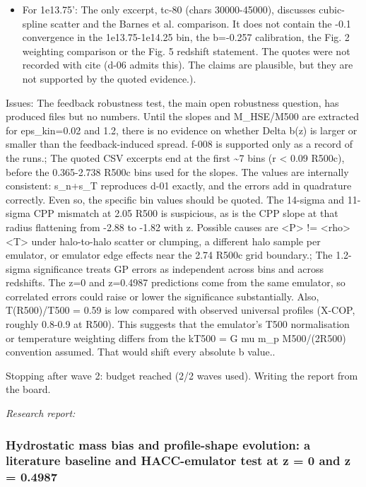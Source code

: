 \documentclass[11pt,a4paper]{article}
\begin{document}
\begin{itemize}
  \item For 1e13.75': The only excerpt, tc-80 (chars 30000-45000), discusses cubic-spline scatter and the Barnes et al. comparison. It does not contain the -0.1 convergence in the 1e13.75-1e14.25 bin, the b=-0.257 calibration, the Fig. 2 weighting comparison or the Fig. 5 redshift statement. The quotes were not recorded with cite (d-06 admits this). The claims are plausible, but they are not supported by the quoted evidence.).
\end{itemize}
Issues: The feedback robustness test, the main open robustness question, has produced files but no numbers. Until the slopes and M\_HSE/M500 are extracted for eps\_kin=0.02 and 1.2, there is no evidence on whether Delta b(z) is larger or smaller than the feedback-induced spread. f-008 is supported only as a record of the runs.; The quoted CSV excerpts end at the first \textasciitilde{}7 bins (r \textless{} 0.09 R500c), before the 0.365-2.738 R500c bins used for the slopes. The values are internally consistent: s\_n+s\_T reproduces d-01 exactly, and the errors add in quadrature correctly. Even so, the specific bin values should be quoted. The 14-sigma and 11-sigma CPP mismatch at 2.05 R500 is suspicious, as is the CPP slope at that radius flattening from -2.88 to -1.82 with z. Possible causes are \textless{}P\textgreater{} != \textless{}rho\textgreater{}\textless{}T\textgreater{} under halo-to-halo scatter or clumping, a different halo sample per emulator, or emulator edge effects near the 2.74 R500c grid boundary.; The 1.2-sigma significance treats GP errors as independent across bins and across redshifts. The z=0 and z=0.4987 predictions come from the same emulator, so correlated errors could raise or lower the significance substantially. Also, T(R500)/T500 = 0.59 is low compared with observed universal profiles (X-COP, roughly 0.8-0.9 at R500). This suggests that the emulator's T500 normalisation or temperature weighting differs from the kT500 = G mu m\_p M500/(2R500) convention assumed. That would shift every absolute b value..

Stopping after wave 2: budget reached (2/2 waves used). Writing the report from the board.

\textit{Research report:}\par
\subsubsection*{Hydrostatic mass bias and profile-shape evolution: a literature baseline and HACC-emulator test at z = 0 and z = 0.4987}
\end{document}
